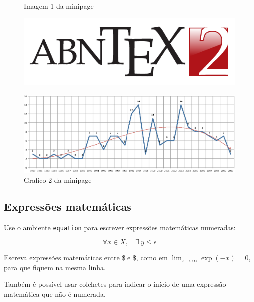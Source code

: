 \begin{figure}[H]
	\label{teste}
	\centering
	\begin{minipage}{0.4\textwidth}
		\centering
		\caption{Imagem 1 da minipage} \label{fig_minipage_imagem1}
		\includegraphics[scale=0.9]{USPSC-modelo-img-marca.pdf}
	\end{minipage}
	\hfill
	\begin{minipage}{0.4\textwidth}
		\centering
		\caption{Grafico 2 da minipage} \label{fig_minipage_grafico2}
		\includegraphics[scale=0.2]{USPSC-modelo-img-grafico.pdf}
	\end{minipage}
\end{figure}

\subsection{Expressões matemáticas}


Use o ambiente \texttt{equation} para escrever
expressões matemáticas numeradas:

\begin{equation}
\forall x \in X, \quad \exists \: y \leq \epsilon
\end{equation}

Escreva expressões matemáticas entre \$ e \$, como em $ \lim_{x \to \infty}
\exp(-x) = 0 $, para que fiquem na mesma linha.

Também é possível usar colchetes para indicar o início de uma expressão
matemática que não é numerada.

